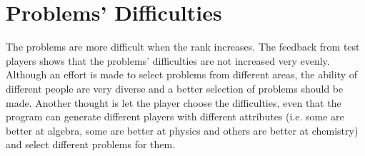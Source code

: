 \documentclass[letterpaper, 12pt]{report}
\begin{document}
\section{Problems' Difficulties}
The problems are more difficult when the rank increases. The feedback from test players shows that the problems' difficulties are not increased very evenly. Although an effort is made to select problems from different areas, the ability of different people are very diverse and a better selection of problems should be made. Another thought is let the player choose the difficulties, even that the program can generate different players with different attributes (i.e. some are better at algebra, some are better at physics and others are better at chemistry) and select different problems for them.
\end{document}
